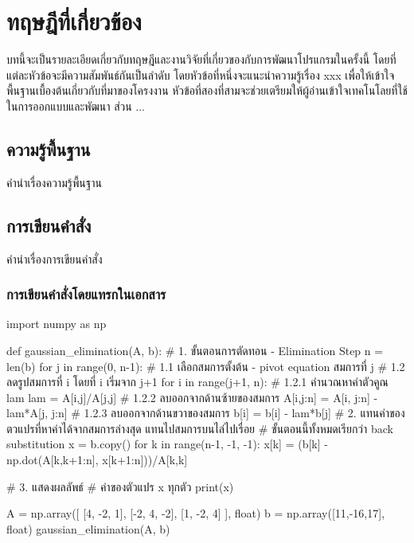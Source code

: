 \documentclass[a4paper]{ubu}
\begin{document}
\chapter{ทฤษฎีที่เกี่ยวข้อง}

บทนี้จะเป็นรายละเอียดเกี่ยวกับทฤษฎีและงานวิจัยที่เกี่ยวของกับการพัฒนาโปรแกรมในครั้งนี้ โดยที่แต่ละหัวข้อจะมีความสัมพันธ์กันเป็นลำดับ โดยหัวข้อที่หนึ่งจะแนะนำความรู้เรื่อง xxx เพื่อให้เข้าใจพื้นฐานเบื้องต้นเกี่ยวกับที่มาของโครงงาน หัวข้อที่สองที่สามจะช่วยเตรียมให้ผู้อ่านเข้าใจเทคโนโลยที่ใช้ในการออกแบบและพัฒนา ส่วน ...

\section{ความรู้พื้นฐาน}

คำนำเรื่องความรู้พื้นฐาน

\section{การเขียนคำสั่ง}

คำนำเรื่องการเขียนคำสั่ง

\subsection{การเขียนคำสั่งโดยแทรกในเอกสาร}


import numpy as np

def gaussian_elimination(A, b):
    # 1. ขั้นตอนการตัดทอน - Elimination Step
    n = len(b)
    for j in range(0, n-1): 
        # 1.1 เลือกสมการตั้งต้น - pivot equation สมการที่ j
        # 1.2 ลดรูปสมการที่ i โดยที่ i เริ่มจาก j+1
        for i in range(j+1, n):
            # 1.2.1 คำนวณหาค่าตัวคูณ  lam
            lam = A[i,j]/A[j,j]
            # 1.2.2 ลบออกจากด้านซ้ายของสมการ
            A[i,j:n] = A[i, j:n] - lam*A[j, j:n]
            # 1.2.3 ลบออกจากด้านขวาของสมการ
            b[i] = b[i] - lam*b[j]
    # 2. แทนค่าของตวแปรที่หาค่าได้จากสมการล่างสุด แทนไปสมการบนไล่ไปเรื่อย
    #    ขั้นตอนนี้ทั้งหมดเรียกว่า back substitution
    x = b.copy()
    for k in range(n-1, -1, -1):
        x[k] = (b[k] - np.dot(A[k,k+1:n], x[k+1:n]))/A[k,k]

    # 3. แสดงผลลัพธ์
    #    ค่าของตัวแปร x ทุกตัว
    print(x)

A = np.array([
        [4, -2, 1],
        [-2, 4, -2],
        [1, -2, 4]
    ], float)
b = np.array([11,-16,17], float)
gaussian_elimination(A, b)
\end{document}
